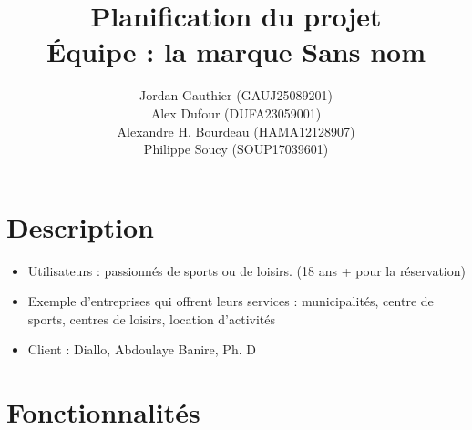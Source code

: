 \documentclass[letter,12pt]{exam}
\author{Jordan Gauthier (GAUJ25089201)\\
Alex Dufour (DUFA23059001)\\
Alexandre H. Bourdeau (HAMA12128907)\\
Philippe Soucy (SOUP17039601)}
\title{Planification du projet\\
Équipe : la marque Sans nom}
\date{}
\begin{document}
\maketitle

\section{Description}\label{description}

\begin{itemize}

\item Utilisateurs : passionnés de sports ou de loisirs. (18 ans + pour la
réservation)
\item Exemple d'entreprises qui offrent leurs services : municipalités, centre de sports, centres de loisirs, location d'activités

\item Client : Diallo, Abdoulaye Banire, Ph. D

\end{itemize}

\section{Fonctionnalités}\label{fonctionnalites}
\end{document}
